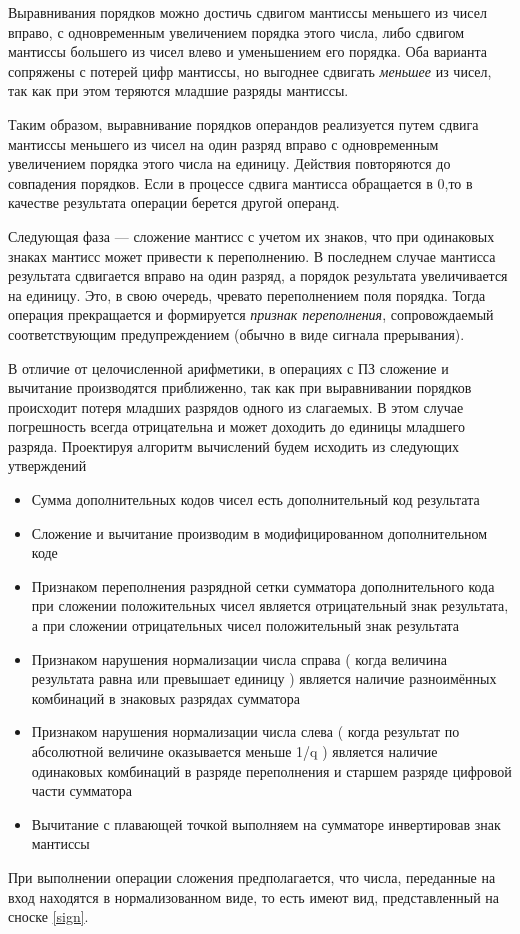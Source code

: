 \documentclass[a4paper,14pt]{extarticle}
\begin{document}
Выравнивания порядков можно достичь сдвигом мантиссы меньшего из чисел вправо, с одновременным увеличением порядка этого числа, либо сдвигом мантиссы большего из чисел влево и уменьшением его порядка. Оба варианта сопряжены с потерей цифр мантиссы, но выгоднее сдвигать \textit{меньшее} из чисел, так как при этом теряются младшие разряды мантиссы.

Таким образом, выравнивание порядков операндов реализуется путем сдвига мантиссы меньшего из чисел на один разряд вправо с одновременным увеличением порядка этого числа на единицу. Действия повторяются до совпадения порядков. Если в процессе сдвига мантисса обращается в 0,то в качестве результата операции берется другой операнд.

Следующая фаза --- сложение мантисс с учетом их знаков, что при одинаковых знаках мантисс может привести к переполнению. В последнем случае мантисса результата сдвигается вправо на один разряд, а порядок результата увеличивается на единицу. Это, в свою очередь, чревато переполнением поля порядка. Тогда операция прекращается и формируется \textit{признак переполнения}, сопровождаемый соответствующим предупреждением (обычно в виде сигнала прерывания).

В отличие от целочисленной арифметики, в операциях с ПЗ сложение и вычитание производятся приближенно, так как при выравнивании порядков происходит потеря младших разрядов одного из слагаемых. В этом случае погрешность всегда отрицательна и может доходить до единицы младшего разряда.
Проектируя алгоритм вычислений будем исходить из следующих утверждений
\begin{itemize}
	\item Сумма дополнительных кодов чисел есть дополнительный код результата
	\item Сложение и вычитание производим в модифицированном дополнительном коде
	\item Признаком переполнения разрядной сетки сумматора дополнительного кода при сложении положительных чисел является отрицательный знак результата, а при сложении отрицательных чисел положительный знак результата
	\item Признаком нарушения нормализации числа справа ( когда величина результата равна или превышает единицу ) является наличие разноимённых комбинаций в знаковых разрядах сумматора
	\item  Признаком нарушения нормализации числа слева ( когда результат по абсолютной величине оказывается меньше 1/q ) является наличие одинаковых комбинаций в разряде переполнения и старшем разряде цифровой части сумматора
	\item Вычитание с плавающей точкой выполняем на сумматоре инвертировав знак мантиссы
\end{itemize}
\fi
При выполнении операции сложения предполагается, что числа, переданные на вход находятся в нормализованном виде, то есть имеют вид, представленный на сноске \ref{sign}.
\end{document}
